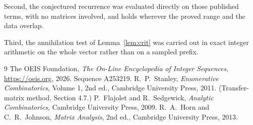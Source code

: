 \documentclass[11pt,a4paper]{article}
\theoremstyle{plain}
\theoremstyle{definition}
\begin{document}
Second, the conjectured recurrence was evaluated directly on those published terms, with no
matrices involved, and holds wherever the proved range and the data overlap.

Third, the annihilation test of Lemma~\ref{lem:crit} was carried out in exact integer
arithmetic on the whole vector rather than on a sampled prefix.

\begin{thebibliography}{9}
 The OEIS Foundation, \emph{The On-Line Encyclopedia of Integer
Sequences}, \url{https://oeis.org}, 2026. Sequence A253219.
 R.~P.~Stanley, \emph{Enumerative Combinatorics}, Volume 1, 2nd ed.,
Cambridge University Press, 2011. (Transfer-matrix method, Section 4.7.)
 P.~Flajolet and R.~Sedgewick, \emph{Analytic Combinatorics}, Cambridge
University Press, 2009.
 R.~A.~Horn and C.~R.~Johnson, \emph{Matrix Analysis}, 2nd ed., Cambridge
University Press, 2013.
\end{thebibliography}
\end{document}
